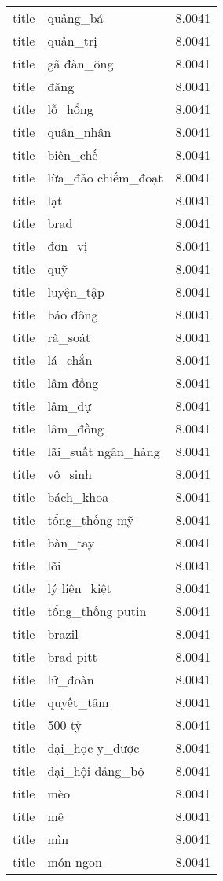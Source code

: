 \documentclass{article}
\begin{document}
\begin{tabular}{lll}
title & quảng\_bá & 8.0041\\
title & quản\_trị & 8.0041\\
title & gã đàn\_ông & 8.0041\\
title & đăng & 8.0041\\
title & lỗ\_hổng & 8.0041\\
title & quân\_nhân & 8.0041\\
title & biên\_chế & 8.0041\\
title & lừa\_đảo chiếm\_đoạt & 8.0041\\
title & lạt & 8.0041\\
title & brad & 8.0041\\
title & đơn\_vị & 8.0041\\
title & quỹ & 8.0041\\
title & luyện\_tập & 8.0041\\
title & báo đông & 8.0041\\
title & rà\_soát & 8.0041\\
title & lá\_chắn & 8.0041\\
title & lâm đồng & 8.0041\\
title & lâm\_dự & 8.0041\\
title & lâm\_đồng & 8.0041\\
title & lãi\_suất ngân\_hàng & 8.0041\\
title & vô\_sinh & 8.0041\\
title & bách\_khoa & 8.0041\\
title & tổng\_thống mỹ & 8.0041\\
title & bàn\_tay & 8.0041\\
title & lõi & 8.0041\\
title & lý liên\_kiệt & 8.0041\\
title & tổng\_thống putin & 8.0041\\
title & brazil & 8.0041\\
title & brad pitt & 8.0041\\
title & lữ\_đoàn & 8.0041\\
title & quyết\_tâm & 8.0041\\
title & 500 tỷ & 8.0041\\
title & đại\_học y\_dược & 8.0041\\
title & đại\_hội đảng\_bộ & 8.0041\\
title & mèo & 8.0041\\
title & mê & 8.0041\\
title & mìn & 8.0041\\
title & món ngon & 8.0041\\

\end{tabular}
\end{document}
